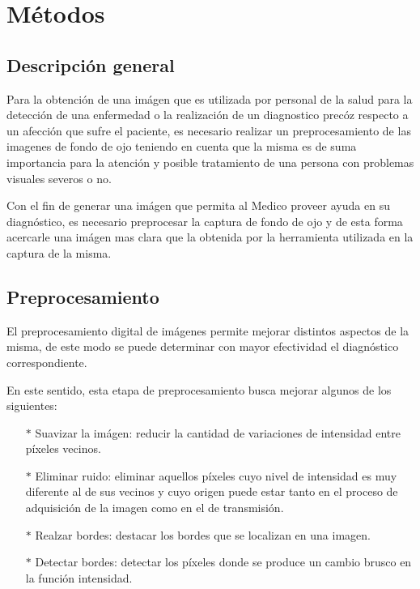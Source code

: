 
\chapter{M\'etodos} %

\label{Chapter3} %


\section{Descripci\'on general}

Para la obtenci\'on de una im\'agen que es utilizada por personal de la salud para la detecci\'on de una enfermedad o la realizaci\'on de un diagnostico prec\'oz respecto a un afecci\'on que sufre el paciente, es necesario realizar un preprocesamiento de las imagenes de fondo de ojo teniendo en cuenta que la misma es de suma importancia para la atenci\'on y posible tratamiento de una persona con problemas visuales severos o no.

Con el fin de generar una im\'agen que permita al Medico proveer ayuda en su diagn\'ostico, es necesario preprocesar la captura de fondo de ojo y de esta forma acercarle una im\'agen mas clara que la obtenida por la herramienta utilizada en la captura de la misma.




\section{Preprocesamiento}

El preprocesamiento digital de im\'agenes permite mejorar distintos aspectos de la misma, de este modo se puede determinar con mayor efectividad el diagn\'ostico correspondiente.

En este sentido, esta etapa de preprocesamiento busca mejorar algunos de los siguientes:

\begin{itemize}
	\item[$*$] Suavizar la im\'agen:  reducir la cantidad de variaciones de intensidad entre píxeles vecinos.					\item[$*$] Eliminar ruido: eliminar aquellos píxeles cuyo nivel de intensidad es muy diferente al de sus vecinos y cuyo origen puede estar tanto en el proceso de adquisición de la imagen como en el de transmisión.
	\item[$*$] Realzar bordes: destacar los bordes que se localizan en una imagen.
	\item[$*$] Detectar bordes: detectar los píxeles donde se produce un cambio brusco en la función intensidad.
\end{itemize}

